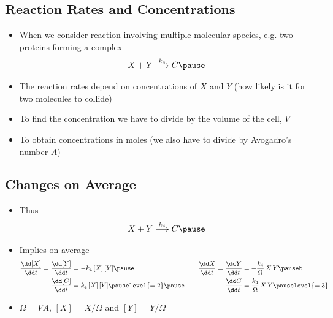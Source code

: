 
\begin{slide}
\section{Reaction Rates and Concentrations}

\begin{PauseHighLight}
  \begin{itemize}
  \item When we consider reaction involving multiple molecular species,
    e.g. two proteins forming a complex
    \begin{align*}
      X + Y \stackrel{k_4}{\longrightarrow} C\pause
    \end{align*}
  \item The reaction rates depend on concentrations of $X$ and $Y$ (how
    likely is it for two molecules to collide)\pause
  \item To find the concentration we have to divide by the volume of the
    cell, $V$\pause
  \item To obtain concentrations in moles (we also have to divide by
    Avogadro's number $A$)\pause
  \end{itemize}
\end{PauseHighLight}

\end{slide}


\begin{slide}
\section{Changes on Average}

\begin{PauseHighLight}
  \begin{itemize}
  \item Thus
    \begin{align*}
      X + Y \stackrel{k_4}{\longrightarrow} C\pause
    \end{align*}
  \item Implies on average
    \begin{align*}
      \frac{\dd [X]}{\dd t} = \frac{\dd [Y]}{\dd t}
      &= -k_4 \, [X]\,[Y] \pause
      &&&
        \frac{\dd X}{\dd t} = \frac{\dd Y}{\dd t}
      &= -\frac{k_4}{\Omega} \, X\,Y \pauseb
      \\
      \frac{\dd [C]}{\dd t}
      &= k_4 \, [X]\,[Y]\pauselevel{=2} \pause
      &&& \frac{\dd C}{\dd t}
      &= \frac{k_4}{\Omega} \, X\,Y\pauselevel{=3}
    \end{align*}  
  \item $\Omega=V A$, $[X]=X/\Omega$ and $[Y]=Y/\Omega$\pauseb
  \end{itemize}
\end{PauseHighLight}

\end{slide}




